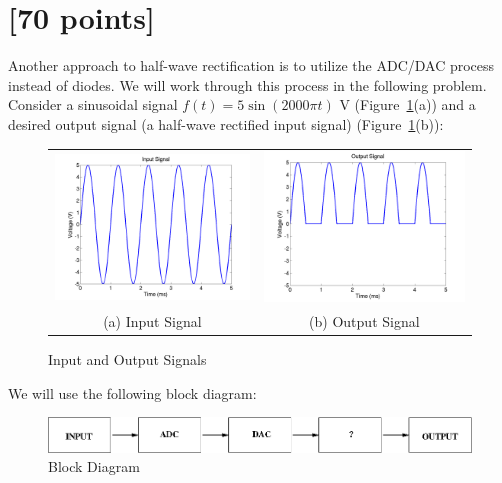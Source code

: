 

\section{[70 points]}

Another approach to half-wave rectification is to utilize the ADC/DAC process instead of diodes.  We will work through this process in the following problem.  Consider a sinusoidal signal $f(t) = 5 \sin(2000 \pi t)$ V (Figure~\ref{fig:sig}(a)) and a desired output signal (a half-wave rectified input signal) (Figure~\ref{fig:sig}(b)):

\begin{figure}[htb!]
\begin{tabular}{cc}
\centering
\includegraphics[width=0.5\linewidth]{in.png} &
\includegraphics[width=0.5\linewidth]{out.png} \\
(a) Input Signal & (b) Output Signal \\
\end{tabular}
\caption{Input and Output Signals}
\label{fig:sig}
\end{figure}

\vspace*{0.5in}

We will use the following block diagram:

\vspace*{0.5in}

\begin{figure}[htb!]
\centering
\includegraphics[width=0.75\linewidth]{block.png}
\caption{Block Diagram}
\label{fig:block}
\end{figure}

